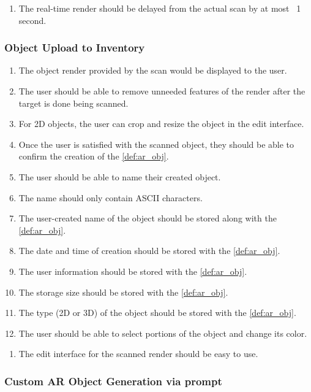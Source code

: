 \documentclass{article}
\begin{document}
\begin{enumerate}[label=OS-NFR\arabic*:]
    \item The real-time render should be delayed from the actual scan by at most ~1 second.
\end{enumerate}

\subsubsection{Object Upload to Inventory}
\label{ssub:obj_upload_inv}
\begin{enumerate}[label=OUI-FR\arabic*:]
    \item The object render provided by the scan would be displayed to the user.
    \item The user should be able to remove unneeded features of the render after the target is done being scanned.
    \item For 2D objects, the user can crop and resize the object in the edit interface.
    \item Once the user is satisfied with the scanned object, they should be able to confirm the creation of the \ref{def:ar_obj}.
    \item The user should be able to name their created object.
    \item The name should only contain ASCII characters.
    \item The user-created name of the object should be stored along with the \ref{def:ar_obj}.
    \item The date and time of creation should be stored with the \ref{def:ar_obj}.
    \item The user information should be stored with the \ref{def:ar_obj}.
    \item The storage size should be stored with the \ref{def:ar_obj}.
    \item The type (2D or 3D) of the object should be stored with the \ref{def:ar_obj}.
    \item The user should be able to select portions of the object and change its color.
\end{enumerate}

\begin{enumerate}[label=OUI-NFR\arabic*:]
    \item The edit interface for the scanned render should be easy to use.
\end{enumerate}

\subsubsection{Custom AR Object Generation via prompt}
\label{ssub:prompt_obj_gen}
\end{document}
